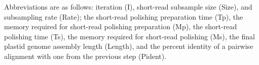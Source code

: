 \begingroup
\scriptsize
\setlength{\parskip}{2pt}

Abbreviations are as follows: 
iteration (I), short-read subsample size (Size), and subsampling rate (Rate);
the short-read polishing preparation time (Tp),
the memory required for short-read polishing preparation (Mp),
the short-read polishing time (Ts),
the memory required for short-read polishing (Ms),
the final plastid genome assembly length (Length), and
the percent identity of a pairwise alignment with one from the previous step (Pident).

\endgroup

